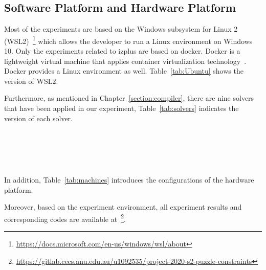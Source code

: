 \subsection{Software Platform and Hardware Platform}
\label{sec:softplat}
Most of the experiments are based on the Windows subsystem for Linux 2 (WSL2)~\footnote{\url{https://docs.microsoft.com/en-us/windows/wsl/about}} which allows the developer to run a Linux environment on Windows 10. Only the experiments related to izplus are based on docker. Docker is a lightweight virtual machine that applies container virtualization technology~\cite{r25}. Docker provides a Linux environment as well. Table~\ref{tab:Ubuntu} shows the version of WSL2.
\begin{table}[htbp]
  \centering

  \caption{The version of Windows subsystem for Linux 2}
  
  \label{tab:Ubuntu}
  
\end{table}
Furthermore, as mentioned in Chapter~\ref{section:compiler}, there are nine solvers that have been applied in our experiment, Table~\ref{tab:solvers} indicates the version of each solver.
\begin{table}[htbp]
  \centering

  \caption{The deployed solvers and corresponding versions}
  
  \label{tab:solvers}
  	\begin{subtable}[b]{\textwidth}
  	\centering
  
    \end{subtable}\\
    	\begin{subtable}[b]{\textwidth}
  	\centering
  
  \end{subtable}\\
  \begin{subtable}[b]{\textwidth}
  \centering
  
  \end{subtable}
\end{table}
\\In addition, Table~\ref{tab:machines} introduces the configurations of the hardware platform.
\begin{table}[H]
  \centering

  \caption{Processor used in our evaluation}
  
  \label{tab:machines}
  
\end{table}
Moreover, based on the experiment environment, all experiment results and corresponding codes are available at~\footnote{\url{https://gitlab.cecs.anu.edu.au/u1092535/project-2020-s2-puzzle-constraints}}.
